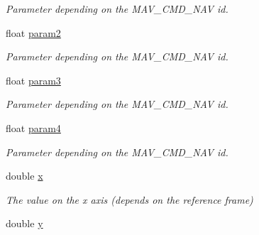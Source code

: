 \begin{DoxyCompactItemize}
\begin{DoxyCompactList}\small\item\em Parameter depending on the M\+A\+V\+\_\+\+C\+M\+D\+\_\+\+N\+A\+V id. \end{DoxyCompactList}\item 
\hypertarget{structwaypoint__struct_aa2a8489b5dcfd2f8a801a71f5b50abad}{float \hyperlink{structwaypoint__struct_aa2a8489b5dcfd2f8a801a71f5b50abad}{param2}}\label{structwaypoint__struct_aa2a8489b5dcfd2f8a801a71f5b50abad}

\begin{DoxyCompactList}\small\item\em Parameter depending on the M\+A\+V\+\_\+\+C\+M\+D\+\_\+\+N\+A\+V id. \end{DoxyCompactList}\item 
\hypertarget{structwaypoint__struct_a847083ffa4611ca72193d694499904ad}{float \hyperlink{structwaypoint__struct_a847083ffa4611ca72193d694499904ad}{param3}}\label{structwaypoint__struct_a847083ffa4611ca72193d694499904ad}

\begin{DoxyCompactList}\small\item\em Parameter depending on the M\+A\+V\+\_\+\+C\+M\+D\+\_\+\+N\+A\+V id. \end{DoxyCompactList}\item 
\hypertarget{structwaypoint__struct_a0e83af4fb268da308155aaaf17fe3304}{float \hyperlink{structwaypoint__struct_a0e83af4fb268da308155aaaf17fe3304}{param4}}\label{structwaypoint__struct_a0e83af4fb268da308155aaaf17fe3304}

\begin{DoxyCompactList}\small\item\em Parameter depending on the M\+A\+V\+\_\+\+C\+M\+D\+\_\+\+N\+A\+V id. \end{DoxyCompactList}\item 
\hypertarget{structwaypoint__struct_aac04df2155c3ae716c937607170850f4}{double \hyperlink{structwaypoint__struct_aac04df2155c3ae716c937607170850f4}{x}}\label{structwaypoint__struct_aac04df2155c3ae716c937607170850f4}

\begin{DoxyCompactList}\small\item\em The value on the x axis (depends on the reference frame) \end{DoxyCompactList}\item 
\hypertarget{structwaypoint__struct_ac62018beaeb5a5eaa500c93e4112fc15}{double \hyperlink{structwaypoint__struct_ac62018beaeb5a5eaa500c93e4112fc15}{y}}\label{structwaypoint__struct_ac62018beaeb5a5eaa500c93e4112fc15}


\end{DoxyCompactItemize}
